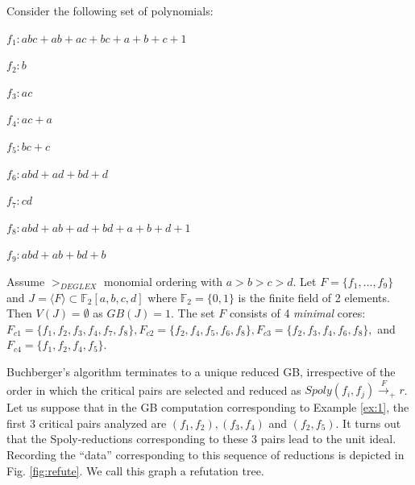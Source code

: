 \begin{example}
\label{ex:1}
Consider the following set of polynomials:
\begin{center}
$f_1: abc + ab + ac + bc + a + b + c + 1$
\end{center}
\begin{center}
$f_2: b$
\end{center}
\begin{center}
$f_3: ac$
\end{center}
\begin{center}
$f_4: ac + a$
\end{center}
\begin{center}
$f_5: bc + c$
\end{center}
\begin{center}
$f_6: abd + ad + bd + d$
\end{center}
\begin{center}
$f_7: cd$
\end{center}
\begin{center}
$f_8: abd + ab + ad + bd + a + b + d + 1$
\end{center}
\begin{center}
$f_9: abd + ab +bd + b$
\end{center}

Assume $>_{DEGLEX}$ monomial ordering with $a>b>c>d$. 
Let $F = \{f_1,\dots,f_9\}$ and 
$J = \langle F \rangle \subset \mathbb{F}_2[a,b,c,d]$ where
$\mathbb{F}_2 = \{0, 1\}$ is the finite field of 2 elements. Then 
$V(J) = \emptyset$ as $GB(J) = 1$.  The set $F$ consists of 4 {\it minimal}
cores: $F_{c1} = \{ f_1,f_2,f_3,f_4,f_7,f_8\}, F_{c2} = \{
f_2,f_4,f_5,f_6,f_8\}, F_{c3} = \{ f_2,f_3,f_4,f_6,f_8\},$ and $F_{c4}
= \{ f_1,f_2,f_4,f_5\}$. 
\end{example}

Buchberger's algorithm terminates to a unique reduced GB, irrespective
of the order in which the critical pairs are selected and reduced as
$Spoly(f_i,f_j)\xrightarrow{F}_+r$. Let us suppose that in the GB
computation corresponding to Example \ref{ex:1}, the first 3 critical
pairs analyzed are $(f_1, f_2), (f_3, f_4)$ and $(f_2,f_5)$. It turns
out that the Spoly-reductions corresponding to these 3 pairs lead to
the unit ideal. Recording the ``data'' corresponding to this sequence
of reductions is depicted in Fig. \ref{fig:refute}. We call this
graph a refutation tree. 



